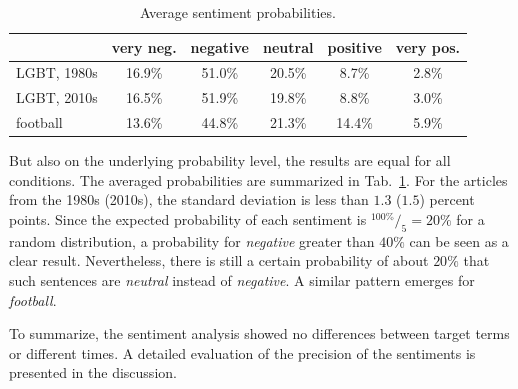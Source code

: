 \documentclass[10pt,a4paper,twocolumn]{scrartcl}
\begin{document}
\begin{table}
\centering
\caption{Average sentiment probabilities.} \label{tab:prob}
\begin{tabular}{lccccc}
\toprule
 & very neg. & negative & neutral & positive & very pos.\\
\midrule
LGBT, 1980s & 16.9\% & 51.0\% & 20.5\% & 8.7\% & 2.8\%\\
LGBT, 2010s & 16.5\% & 51.9\% & 19.8\% & 8.8\% & 3.0\%\\
football &  13.6\% & 44.8\% & 21.3\% & 14.4\% & 5.9\%\\
\bottomrule
\end{tabular}
\end{table}

But also on the underlying probability level, the results are equal for all conditions. The averaged probabilities are summarized in Tab.~\ref{tab:prob}. For the articles from the 1980s (2010s), the standard deviation is less than $1.3$ ($1.5$) percent points. Since the expected probability of each sentiment is $^{100\%}/_{5} = 20\%$  for a random distribution, a probability for \textit{negative} greater than $40\%$ can be seen as a clear result. Nevertheless, there is still a certain probability of about $20\%$ that such sentences are \textit{neutral} instead of \textit{negative}. A similar pattern emerges for \textit{football}.

To summarize, the sentiment analysis showed no differences between target terms or different times. A detailed evaluation of the precision of the sentiments is presented in the discussion.
\end{document}
